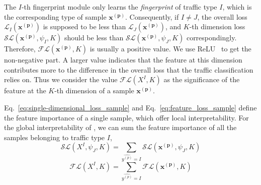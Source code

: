 The $I$-th fingerprint module only learns the \emph{fingerprint} of traffic type $I$, which is the corresponding type of sample $\mathbf{x^{(p)}}$. 
Consequently, if $I \neq J$, the overall loss $\mathcal{L}_I(\mathbf{x^{(p)}})$ is supposed to be less than $\mathcal{L}_J(\mathbf{x^{(p)}})$, and $K$-th dimension loss $\mathcal{SL}(\mathbf{x^{(p)}},  \psi_I,  K) $ should be less than $\mathcal{SL}(\mathbf{x^{(p)}},  \psi_J,  K) $ correspondingly. 
Therefore, $\mathcal{FL}(\mathbf{x^{(p)}}, K)$ is usually a positive value.  
We use ReLU~\cite{nair2010rectified} to get the non-negative part. 
A larger value indicates that the feature at this dimension contributes more to the difference in the overall loss that the traffic classification relies on. 
Thus we consider the value $\mathcal{FL}(X^I, K)$ as the significance of the feature at the $K$-th dimension of a sample $\mathbf{x^{(p)}}$.

Eq.~\eqref{eq:single-dimensional_loss_sample} and Eq.~\eqref{eq:feature_loss_sample} define the feature importance of a single sample, which offer local interpretability.
For the global interpretability of \sys, we can sum the feature importance of all the samples belonging to traffic type $I$,
\begin{equation}\label{eq:single-dimensional_loss}
\mathcal{SL}(X^I,  \psi_J,  K) = \sum_{\hat{y^{(p)}}=I}\mathcal{SL}(\mathbf{x^{(p)}},  \psi_J,  K) 
\end{equation}
\begin{equation}\label{eq:feature_loss}
\mathcal{FL}(X^I, K) = \sum_{\hat{y^{(p)}}=I} \mathcal{FL}(\mathbf{x^{(p)}}, K)
\end{equation}

